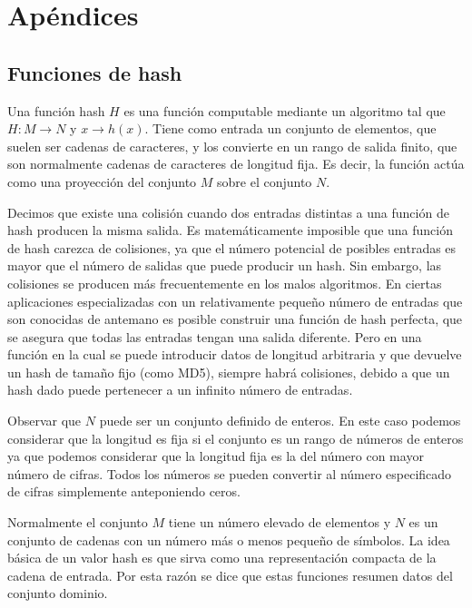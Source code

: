\documentclass[a4paper,10pt, oneside]{article}
\begin{document}
\clearpage\mbox{}\clearpage
\section{Apéndices}

\subsection{Funciones de hash}
Una función hash $H$ es una función computable mediante un algoritmo tal que $H: M \rightarrow N$ y $x \rightarrow h(x)$. Tiene como entrada un conjunto de elementos, que suelen ser cadenas de caracteres, y los convierte en un rango de salida finito, que son normalmente cadenas de caracteres de longitud fija. Es decir, la función actúa como una proyección del conjunto $M$ sobre el conjunto $N$.

Decimos que existe una colisión cuando dos entradas distintas a una función de hash producen la misma salida. Es matemáticamente imposible que una función de hash carezca de colisiones, ya que el número potencial de posibles entradas es mayor que el número de salidas que puede producir un hash. Sin embargo, las colisiones se producen más frecuentemente en los malos algoritmos. En ciertas aplicaciones especializadas con un relativamente pequeño número de entradas que son conocidas de antemano es posible construir una función de hash perfecta, que se asegura que todas las entradas tengan una salida diferente. Pero en una función en la cual se puede introducir datos de longitud arbitraria y que devuelve un hash de tamaño fijo (como MD5), siempre habrá colisiones, debido a que un hash dado puede pertenecer a un infinito número de entradas.

Observar que $N$ puede ser un conjunto definido de enteros. En este caso podemos considerar que la longitud es fija si el conjunto es un rango de números de enteros ya que podemos considerar que la longitud fija es la del número con mayor número de cifras. Todos los números se pueden convertir al número especificado de cifras simplemente anteponiendo ceros.

Normalmente el conjunto $M$ tiene un número elevado de elementos y $N$ es un conjunto de cadenas con un número más o menos pequeño de símbolos. La idea básica de un valor hash es que sirva como una representación compacta de la cadena de entrada. Por esta razón se dice que estas funciones resumen datos del conjunto dominio.
\end{document}
